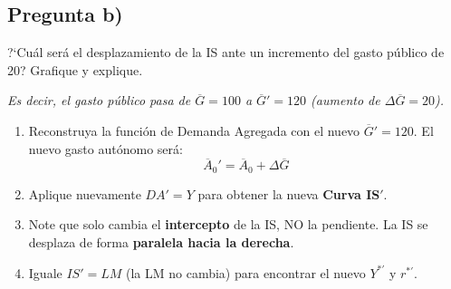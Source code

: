 \documentclass[11pt,a4paper]{article}
\newcommand{\barvar}[1]{\overline{#1}}
\begin{document}
\newpage

\subsection{Pregunta b)}

\noindent ?`Cu\'{a}l ser\'{a} el desplazamiento de la IS ante un incremento del gasto p\'{u}blico de 20? Grafique y explique.

\vspace{0.2cm}
\noindent \textit{Es decir, el gasto p\'{u}blico pasa de $\barvar{G} = 100$ a $\barvar{G}' = 120$ \;(aumento de $\Delta \barvar{G} = 20$).}

\vspace{0.4cm}

\begin{hintbox}
\begin{enumerate}[leftmargin=1.5em, itemsep=4pt]
    \item Reconstruya la funci\'{o}n de Demanda Agregada con el nuevo $\barvar{G}' = 120$. El nuevo gasto aut\'{o}nomo ser\'{a}:
    \[
        \barvar{A}_0' = \barvar{A}_0 + \Delta \barvar{G}
    \]

    \item Aplique nuevamente $DA' = Y$ para obtener la nueva \textbf{Curva IS$'$}.

    \item Note que solo cambia el \textbf{intercepto} de la IS, NO la pendiente. La IS se desplaza de forma \textbf{paralela hacia la derecha}.

    \item Iguale $IS' = LM$ (la LM no cambia) para encontrar el nuevo $Y^{*\prime}$ y $r^{*\prime}$.
\end{enumerate}
\end{hintbox}

\vspace{0.4cm}
\end{document}
